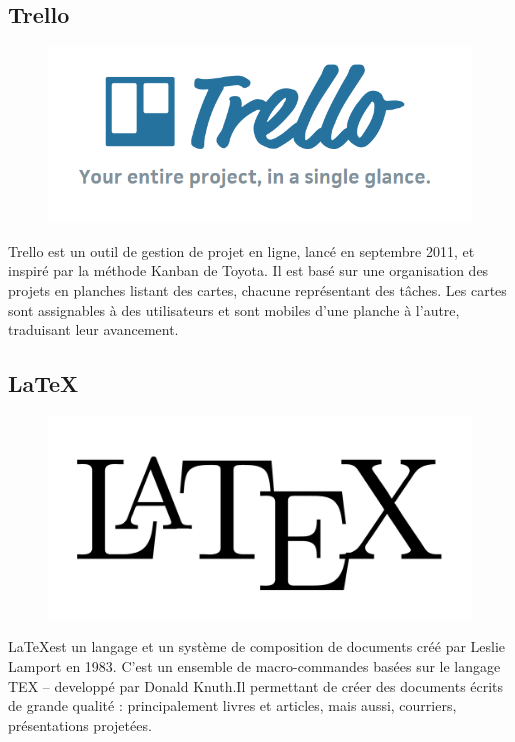 \documentclass[12pt,a4paper]{report}
\begin{document}
		\subsection{Trello}
		\begin{figure}
		\includegraphics[scale=0.25]{./graphics/trello.png}
		\end{figure}
		Trello est un outil de gestion de projet en ligne, lancé en septembre 2011, et inspiré par la méthode Kanban de Toyota. Il est basé sur une organisation des projets en planches listant des cartes, chacune représentant des tâches. Les cartes sont assignables à des utilisateurs et sont mobiles d'une planche à l'autre, traduisant leur avancement.\\
		
		\newpage
		\subsection{\LaTeX}
		\begin{figure}
		\includegraphics[scale=0.05]{./graphics/latex.png}
		\end{figure}
\LaTeX est un langage et un système de composition de documents
créé par Leslie Lamport en 1983. C’est un ensemble de
macro-commandes basées sur le langage TEX – developpé par
Donald Knuth.Il permettant de créer des documents écrits de grande qualité : principalement livres et articles, mais aussi, courriers, présentations projetées.\\
			
\end{document}
